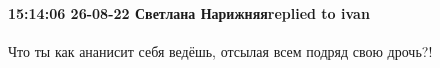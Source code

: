 
 
 
 
 

\paragraph{15:14:06 26-08-22 Светлана Нарижняяreplied to ivan}

Что ты как ананисит себя ведёшь, отсылая всем подряд свою дрочь?!🤣
